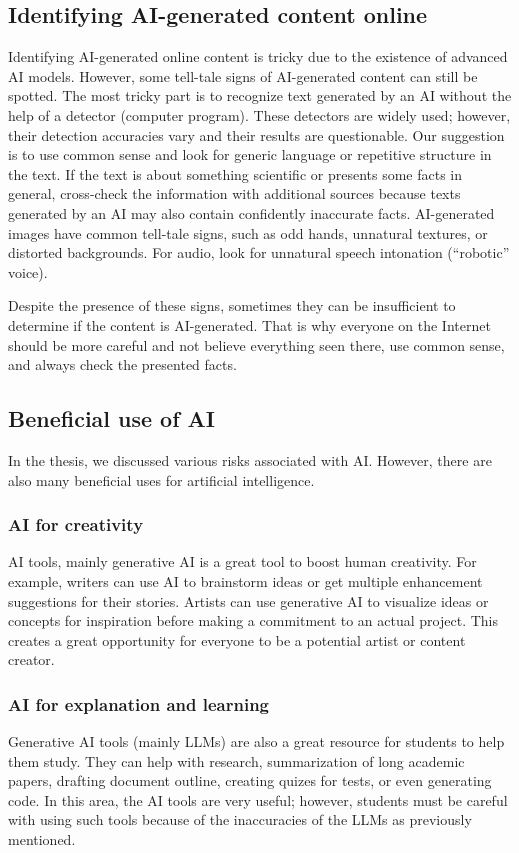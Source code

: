\subsection*{Identifying AI-generated content online}
Identifying AI-generated online content is tricky due to the existence of advanced AI models. However, some tell-tale signs of AI-generated content can still be spotted. The most tricky part is to recognize text generated by an AI without the help of a detector (computer program). These detectors are widely used; however, their detection accuracies vary and their results are questionable. Our suggestion is to use common sense and look for generic language or repetitive structure in the text. If the text is about something scientific or presents some facts in general, cross-check the information with additional sources because texts generated by an AI may also contain confidently inaccurate facts. AI-generated images have common tell-tale signs, such as odd hands, unnatural textures, or distorted backgrounds. For audio, look for unnatural speech intonation (``robotic'' voice).

Despite the presence of these signs, sometimes they can be insufficient to determine if the content is AI-generated. That is why everyone on the Internet should be more careful and not believe everything seen there, use common sense, and always check the presented facts.

\subsection*{Beneficial use of AI}
In the thesis, we discussed various risks associated with AI. However, there are also many beneficial uses for artificial intelligence.

\subsubsection*{AI for creativity}
AI tools, mainly generative AI is a great tool to boost human creativity. For example, writers can use AI to brainstorm ideas or get multiple enhancement suggestions for their stories. Artists can use generative AI to visualize ideas or concepts for inspiration before making a commitment to an actual project. This creates a great opportunity for everyone to be a potential artist or content creator.

\subsubsection*{AI for explanation and learning}
Generative AI tools (mainly LLMs) are also a great resource for students to help them study. They can help with research, summarization of long academic papers, drafting document outline, creating quizes for tests, or even generating code. In this area, the AI tools are very useful; however, students must be careful with using such tools because of the inaccuracies of the LLMs as previously mentioned.


